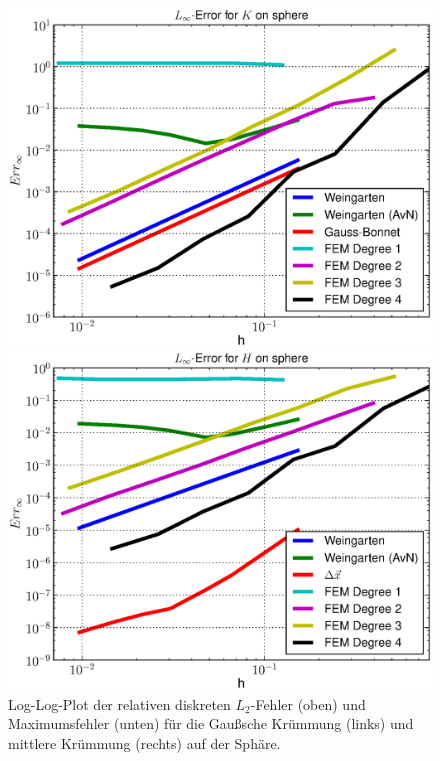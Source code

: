 \begin{figure}
\begin{minipage}[t]{0.49\textwidth}
       \centering\includegraphics[width=\textwidth]{bilder/Curvature/sphere/ErrKLMax.eps}
    \end{minipage}\hfill
    \begin{minipage}[t]{0.49\textwidth}
       \centering\includegraphics[width=\textwidth]{bilder/Curvature/sphere/ErrHLMax.eps}
    \end{minipage}
    \caption[Fehlerplot (Krümmungen auf Sphäre)]
            {Log-Log-Plot der relativen diskreten \( L_{2} \)-Fehler (oben) und Maximumsfehler (unten) 
             für die Gaußsche Krümmung (links) und mittlere Krümmung (rechts) auf der Sphäre.}

\end{figure}
